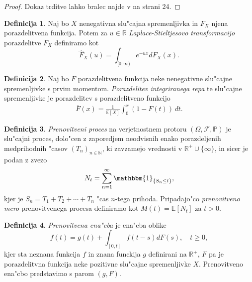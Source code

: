 \documentclass[12pt, a4paper, reqno]{amsart}
\theoremstyle{definition}
\newtheorem{definicija}{Definicija}[section]
\theoremstyle{plain}
\newcommand{\R}{\mathbb{R}}
\newcommand{\N}{\mathbb{N}}
\newcommand{\E}{\mathbb{E}}
\newcommand{\Prob}{\mathbb{P}}
\newcommand{\1}{\mathds{1}}
\begin{document}
    \begin{proof}
        Dokaz trditve lahko bralec najde v \cite{4} na strani 24.
    \end{proof}

    \begin{definicija}
        Naj bo $X$ nenegativna slu"cajna spremenljivka in $F_X$ njena porazdelitvena funkcija. 
        Potem za $u\in\R$ \textit{Laplace-Stieltjesovo transformacijo} porazdelitve $F_X$ definiramo kot
        \begin{equation*}
            \hat{F}_X(u) = \int_{[0, \infty)}e^{-ux}dF_X(x).
        \end{equation*}
        \label{def:LaplaceStiltjesovaTransformacija}
    \end{definicija}

    \begin{definicija}
        Naj bo $F$ porazdelitvena funkcija neke nenegativne slu"cajne spremenljivke s prvim 
        momentom. \textit{Porazdelitev integriranega repa} te slu"cajne spremenljivke je porazdelitev
        s porazdelitveno funkcijo
        \begin{align*}
            \overline{F}(x) = \frac{1}{\mathbb{E}[X]} \int_0^x (1 - F(t)) \, dt.
        \end{align*}

        \label{def:porazdelitevintegriranegaRepa}
    \end{definicija}

    \begin{definicija}
        \textit{Prenovitveni proces} na verjetnostnem protoru $(\Omega, \mathcal{F}, \Prob)$ je slu"cajni 
        proces,
        dolo"cen z zaporedjem neodvisnih enako porazdeljenih medprihodnih "casov $(T_n)_{n\in\N}$, 
        ki zavzamejo vrednosti v $\R^+\cup\{\infty\}$, in sicer je podan z zvezo 
        \begin{equation*}
            N_t = \sum_{n=1}^{\infty}\mathbbm{1}_{\{S_n\leq t\}},
        \end{equation*}
        kjer je $S_n = T_1 + T_2 + \cdots + T_n$ "cas $n$-tega prihoda. Pripadajo"co 
        \textit{prenovitveno mero} prenovitvenega procesa definiramo kot $M(t) = \E\left[N_t\right]$ za 
        $t > 0$.
        \label{def:PrenovitveniProces}
    \end{definicija}

    \begin{definicija}
        \textit{Prenovitvena ena"cba} je ena"cba oblike 
        \begin{equation*}
            f(t) = g(t) + \int_{[0, t]}f(t - s)dF(s), \quad t\geq 0,
        \end{equation*}
        kjer sta neznana funkcija $f$ in znana funckija $g$ definirani na $\R^+$, $F$ pa je 
        porazdelitvna funkcija neke pozitivne slu"cajne spremenljivke $X$. Prenovitveno ena"cbo predstavimo
        s parom $(g, F)$.
        \label{def:prenovitvenaEnacba}
    \end{definicija}
\end{document}
